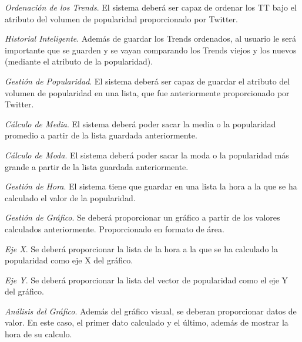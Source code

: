 \begin{enumerate}
{\begin{enumerate}
{        \textit{Ordenación de los Trends}. El sistema deberá ser capaz de ordenar los \ac{TT} bajo el atributo del volumen de popularidad proporcionado por Twitter.
        \item
        \textit{Historial Inteligente}. Además de guardar los Trends ordenados, al usuario le será importante que se guarden y se vayan comparando los Trends viejos y los nuevos (mediante el atributo de la popularidad).
        }\end{enumerate}
    \item
    \textit{Gestión de Popularidad}. El sistema deberá ser capaz de guardar el atributo del volumen de popularidad en una lista, que fue anteriormente proporcionado por Twitter.
    \begin{enumerate}{\renewcommand{\labelenumii}{R.F. \arabic{enumi}.\arabic{enumii}}
        \item
        \textit{Cálculo de Media}. El sistema deberá poder sacar la media o la popularidad promedio a partir de la lista guardada anteriormente.
        \item
        \textit{Cálculo de Moda}. El sistema deberá poder sacar la moda o la popularidad más grande a partir de la lista guardada anteriormente.
        \item
        \textit{Gestión de Hora}. El sistema tiene que guardar en una lista la hora a la que se ha calculado el valor de la popularidad.
        \item
        \textit{Gestión de Gráfico}. Se deberá proporcionar un gráfico a partir de los valores calculados anteriormente. Proporcionado en formato de área.
        \begin{enumerate}{\renewcommand{\labelenumiii}{R.F. \arabic{enumi}.\arabic{enumii}.\arabic{enumiii}}
            \item
            \textit{Eje X}. Se deberá proporcionar la lista de la hora a la que se ha calculado la popularidad como eje X del gráfico.
            \item
            \textit{Eje Y}. Se deberá proporcionar la lista del vector de popularidad como el eje Y del gráfico.
            \item
            \textit{Análisis del Gráfico}. Además del gráfico visual, se deberan proporcionar datos de valor. En este caso, el primer dato calculado y el último, además de mostrar la hora de su calculo.
            }\end{enumerate}
        }\end{enumerate}
    \item
}
\end{enumerate}
